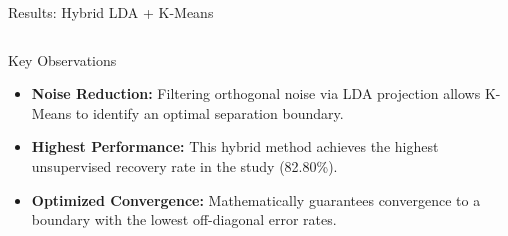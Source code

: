 \documentclass[8pt, aspectratio=169]{beamer}
\begin{document}
\begin{frame}{Results: Hybrid LDA + K-Means}
\begin{columns}
        \vspace{0.4cm}

        \begin{alertblock}{Key Observations}
            \tiny
            \begin{itemize}
                \item \textbf{Noise Reduction:} Filtering orthogonal noise via LDA projection allows K-Means to identify an optimal separation boundary.
                \item \textbf{Highest Performance:} This hybrid method achieves the highest unsupervised recovery rate in the study (82.80\%).
                \item \textbf{Optimized Convergence:} Mathematically guarantees convergence to a boundary with the lowest off-diagonal error rates.
            \end{itemize}
        \end{alertblock}
    \end{columns}
\end{frame}
\end{document}
